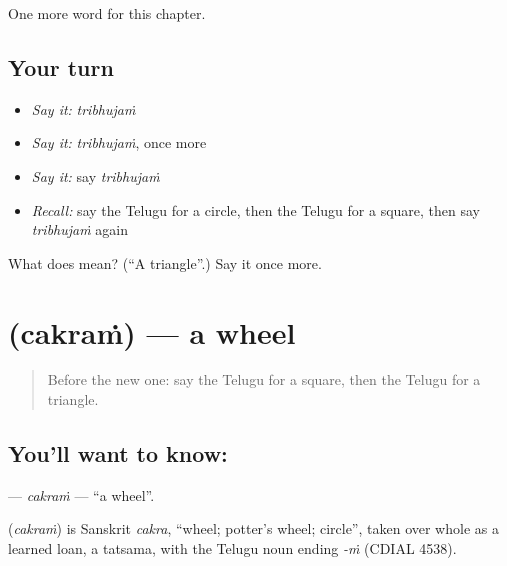\begin{grammarlens}[title={What you've built}]
One more word for this chapter.
\end{grammarlens}

\subsection*{Your turn}
\begin{itemize}
\raggedright
  \item \emph{Say it:} \emph{tribhujaṁ}
  \item \emph{Say it:} \emph{tribhujaṁ}, once more
  \item \emph{Say it:} say \emph{tribhujaṁ}
  \item \emph{Recall:} say the Telugu for a circle, then the Telugu for a square, then say \emph{tribhujaṁ} again
\end{itemize}

\begin{tcolorbox}[breakable,colback=teal!4,colframe=teal!35!black,title={Before you move on}]
What does  mean? (\textquotedblleft{}A triangle\textquotedblright{}.) Say it once more.
\end{tcolorbox}
\section[\texorpdfstring{\te{చక్రం} (cakraṁ)}{చక్రం (cakraṁ)}]{ (cakraṁ) — a wheel}

\label{lesson:TE-C193-cakram}



\begin{quote}
Before the new one: say the Telugu for a square, then the Telugu for a triangle.
\end{quote}

\subsection*{You'll want to know: }
\textbf{} — \emph{cakraṁ} — \textquotedblleft{}a wheel\textquotedblright{}.

\begin{cousinweb}
\textbf{} (\emph{cakraṁ}) is Sanskrit \emph{cakra}, \textquotedblleft{}wheel; potter's wheel; circle\textquotedblright{}, taken over whole as a learned loan, a tatsama, with the Telugu noun ending \emph{-ṁ} (CDIAL 4538).
\end{cousinweb}

